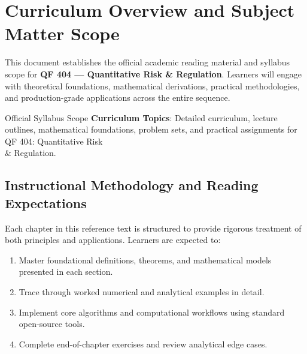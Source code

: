 \section{Curriculum Overview and Subject Matter Scope}

This document establishes the official academic reading material and syllabus scope for \textbf{QF 404 --- Quantitative Risk \& Regulation}. Learners will engage with theoretical foundations, mathematical derivations, practical methodologies, and production-grade applications across the entire sequence.

\begin{InsightBox}{Official Syllabus Scope}
  \textbf{Curriculum Topics}: Detailed curriculum, lecture outlines, mathematical foundations, problem sets, and practical assignments for QF 404: Quantitative Risk \\& Regulation.
\end{InsightBox}

\subsection{Instructional Methodology and Reading Expectations}

Each chapter in this reference text is structured to provide rigorous treatment of both principles and applications. Learners are expected to:
\begin{enumerate}
  \item Master foundational definitions, theorems, and mathematical models presented in each section.
  \item Trace through worked numerical and analytical examples in detail.
  \item Implement core algorithms and computational workflows using standard open-source tools.
  \item Complete end-of-chapter exercises and review analytical edge cases.
\end{enumerate}

